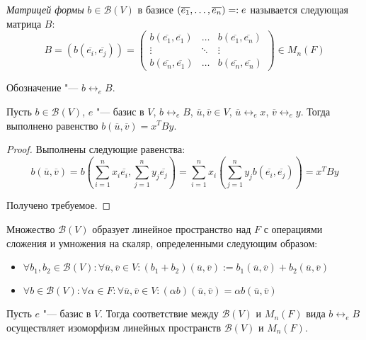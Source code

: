\begin{definition}
	 \textit{Матрицей формы} $b \in \mathcal{B}(V)$ в базисе $(\overline{e_1}, \dots, \overline{e_n}) \hm{=:} e$ называется следующая матрица $B$:
	\[B = (b(\overline{e_i}, \overline{e_j})) = \begin{pmatrix}b(\overline{e_1}, \overline{e_1}) & \dots & b(\overline{e_1}, \overline{e_n})\\
		\vdots & \ddots & \vdots\\
		b(\overline{e_n}, \overline{e_1}) & \dots & b(\overline{e_n}, \overline{e_n})
	\end{pmatrix} \in M_n(F)\]
	
	Обозначение "--- $b \leftrightarrow_e B$.
\end{definition}

\begin{proposition}
	Пусть $b \in \mathcal{B}(V)$, $e$ "--- базис в $V$, $b \leftrightarrow_e B$, $\overline{u}, \overline{v} \in V$, $\overline{u} \leftrightarrow_e x$, $\overline{v} \leftrightarrow_e y$. Тогда выполнено равенство $b(\overline{u}, \overline{v}) = x^TBy$.
\end{proposition}

\begin{proof}
	Выполнены следующие равенства:
	\[b(\overline{u}, \overline{v}) = b\left(\sum_{i = 1}^nx_i\overline{e_i}, \sum_{j = 1}^ny_j\overline{e_j}\right) = \sum_{i = 1}^nx_i\left(\sum_{j = 1}^ny_jb(\overline{e_i}, \overline{e_j})\right) = x^TBy\]

	Получено требуемое.
\end{proof}

\begin{note}
	Множество $\mathcal{B}(V)$ образует линейное пространство над $F$ с операциями сложения и умножения на скаляр, определенными следующим образом:
	\begin{itemize}
		\item $\forall b_1, b_2 \in \mathcal{B}(V): \forall \overline{u}, \overline{v} \in V: (b_1 + b_2)(\overline{u}, \overline{v}) := b_1(\overline{u}, \overline{v}) + b_2(\overline{u}, \overline{v})$
		\item $\forall b \in \mathcal{B}(V): \forall \alpha \in F: \forall \overline{u}, \overline{v} \in V: (\alpha b)(\overline{u}, \overline{v}) = \alpha b(\overline{u}, \overline{v})$
	\end{itemize}
\end{note}

\begin{theorem}
	Пусть $e$ "--- базис в $V$. Тогда соответствие между $\mathcal{B}(V)$ и $M_n(F)$ вида $b \leftrightarrow_e B$ осуществляет изоморфизм линейных пространств $\mathcal{B}(V)$ и $M_n(F)$.
\end{theorem}

